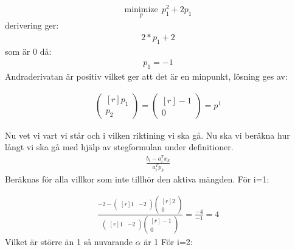 \begin{equation*}
\begin{aligned}
 \underset{p}{\text{minimize}} \ \
p_1^2+2p_1
\end{aligned}
\end{equation*}
derivering ger:
\begin{equation*}
\begin{aligned}
2*p_1+2
\end{aligned}
\end{equation*}
som är 0 då:
\begin{equation*}
\begin{aligned}
p_1=-1
\end{aligned}
\end{equation*}
Andraderivatan är positiv vilket ger att det är en minpunkt, lösning ges av:

\begin{equation*}
\begin{aligned}
  \begin{pmatrix*}[r]
   p_1  \\
   p_2
\end{pmatrix*} =
  \begin{pmatrix*}[r]
   -1  \\
   0
\end{pmatrix*}
=p^1
\end{aligned}
\end{equation*}

Nu vet vi vart vi står och i vilken riktining vi ska gå. Nu ska vi beräkna hur långt vi ska gå med hjälp av stegformulan under definitioner.
\begin{equation*}
\begin{aligned}
\frac{b_i-a_i^Tx_k}{a_i^Tp_k}
\end{aligned}
\end{equation*}
Beräknas för alla villkor som inte tillhör den aktiva mängden. För i=1:

\begin{equation*}
\begin{aligned}
\frac{-2-
  \begin{pmatrix*}[r]
   1  &
   -2
\end{pmatrix*}
  \begin{pmatrix*}[r]
   2  \\
   0
\end{pmatrix*}
}{
  \begin{pmatrix*}[r]
   1  &
   -2
\end{pmatrix*}
  \begin{pmatrix*}[r]
   -1  \\
   0
\end{pmatrix*}}=\frac{-4}{-1}=4
\end{aligned}
\end{equation*}
Vilket är större än 1 så nuvarande $\alpha$ är 1
För i=2:

